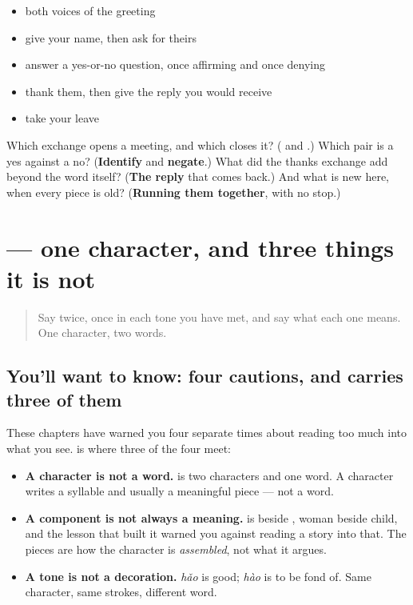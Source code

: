 \begin{itemize}
\raggedright
  \item both voices of the greeting
  \item give your name, then ask for theirs
  \item answer a yes-or-no question, once affirming and once denying
  \item thank them, then give the reply you would receive
  \item take your leave
\end{itemize}

\begin{tcolorbox}[breakable,colback=teal!4,colframe=teal!35!black,title={Before you move on}]
Which exchange opens a meeting, and which closes it? (\textbf{} and \textbf{}.) Which pair is a yes against a no? (\textbf{Identify} and \textbf{negate}.) What did the thanks exchange add beyond the word itself? (\textbf{The reply} that comes back.) And what is new here, when every piece is old? (\textbf{Running them together}, with no stop.)
\end{tcolorbox}
\section[\texorpdfstring{\zh{好} (hǎo, hào)}{好 (hǎo, hào)}]{ — one character, and three things it is not}

\label{lesson:ZH-C11-second-pass-character-and-word}



\begin{quote}
Say  twice, once in each tone you have met, and say what each one means. One character, two words.
\end{quote}

\subsection*{You'll want to know: four cautions, and  carries three of them}
These chapters have warned you four separate times about reading too much into what you see. \textbf{} is where three of the four meet:

\begin{itemize}
\raggedright
  \item \textbf{A character is not a word.}  is two characters and one word. A character writes a syllable and usually a meaningful piece — not a word.
  \item \textbf{A component is not always a meaning.}  is  beside , woman beside child, and the lesson that built it warned you against reading a story into that. The pieces are how the character is \emph{assembled}, not what it argues.
  \item \textbf{A tone is not a decoration.} \emph{hǎo} is good; \emph{hào} is to be fond of. Same character, same strokes, different word.
\end{itemize}

